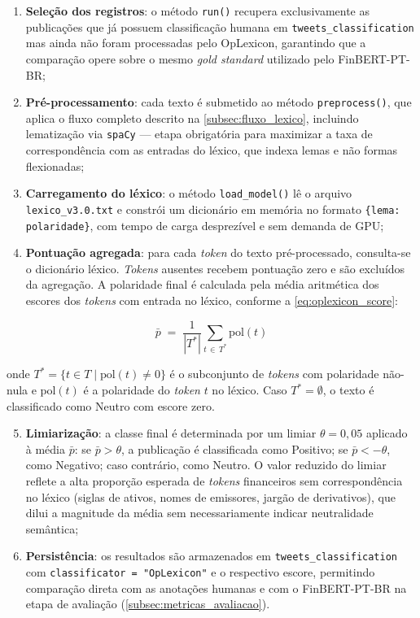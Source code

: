 \begin{enumerate}
	\item \textbf{Seleção dos registros}: o método \texttt{run()} recupera exclusivamente as publicações que já possuem classificação humana em \texttt{tweets\_classification} mas ainda não foram processadas pelo OpLexicon, garantindo que a comparação opere sobre o mesmo
	\textit{gold standard} utilizado pelo FinBERT-PT-BR;
	
	\item \textbf{Pré-processamento}: cada texto é submetido ao método \texttt{preprocess()}, que aplica o fluxo completo descrito na \autoref{subsec:fluxo_lexico}, incluindo lematização via \texttt{spaCy} — etapa obrigatória para maximizar a taxa de correspondência com as entradas do léxico, que indexa lemas e não formas flexionadas;
	
	\item \textbf{Carregamento do léxico}: o método \texttt{load\_model()} lê o arquivo \texttt{lexico\_v3.0.txt} e constrói um dicionário em memória no formato
	\texttt{\{lema: polaridade\}}, com tempo de carga desprezível e sem demanda de GPU;
	
	\item \textbf{Pontuação agregada}: para cada \textit{token} do texto pré-processado, consulta-se o dicionário léxico. \textit{Tokens} ausentes recebem pontuação zero e são excluídos da agregação. A polaridade final é calculada pela média aritmética dos escores dos \textit{tokens} com entrada no léxico, conforme a \autoref{eq:oplexicon_score}:
\end{enumerate}

\begin{equation}
	\label{eq:oplexicon_score}
	\bar{p} \;=\; \frac{1}{|T^{*}|} \sum_{t \,\in\, T^{*}} \mathrm{pol}(t)
\end{equation}

\noindent onde $T^{*} = \{t \in T \mid \mathrm{pol}(t) \neq 0\}$ é o subconjunto de \textit{tokens} com polaridade não-nula e $\mathrm{pol}(t)$ é a polaridade do \textit{token} $t$
no léxico. Caso $T^{*} = \emptyset$, o texto é classificado como Neutro com escore zero.

\begin{enumerate}
	\setcounter{enumi}{4}
	\item \textbf{Limiarização}: a classe final é determinada por um limiar $\theta = 0{,}05$ aplicado à média $\bar{p}$: se $\bar{p} > \theta$, a publicação é classificada como Positivo; se $\bar{p} < -\theta$, como Negativo; caso contrário, como Neutro. O valor reduzido do limiar reflete a alta proporção esperada de \textit{tokens} financeiros sem correspondência no léxico (siglas de ativos, nomes de emissores, jargão de derivativos), que dilui a magnitude da média
	sem necessariamente indicar neutralidade semântica;
	
	\item \textbf{Persistência}: os resultados são armazenados em \texttt{tweets\_classification} com \texttt{classificator = "OpLexicon"} e o respectivo escore, permitindo comparação direta com as anotações humanas e com o FinBERT-PT-BR na etapa de avaliação (\autoref{subsec:metricas_avaliacao}).
\end{enumerate}

